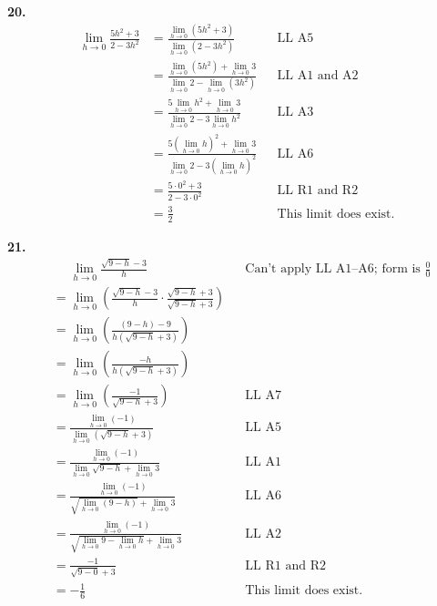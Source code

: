 \documentclass[10pt,oneside,]{book}
\theoremstyle{plain}
\theoremstyle{definition}
\numberwithin{equation}{section}
\begin{document}
\noindent\textbf{20.}\quad{}\begin{align*}
\lim\limits_{h\to0}\frac{5h^2+3}{2-3h^2}&=\frac{\lim\limits_{h\to0}\left(5h^2+3\right)}{\lim\limits_{h\to0}\left(2-3h^2\right)}&&\text{LL A5}\\
&=\frac{\lim\limits_{h\to0}\left(5h^2\right)+\lim\limits_{h\to0}3}{\lim\limits_{h\to0}2-\lim\limits_{h\to0}\left(3h^2\right)}&&\text{LL A1 and A2}\\
&=\frac{5\lim\limits_{h\to0}h^2+\lim\limits_{h\to0}3}{\lim\limits_{h\to0}2-3\lim\limits_{h\to0}h^2}&&\text{LL A3}\\
&=\frac{5\left(\lim\limits_{h\to0}h\right)^2+\lim\limits_{h\to0}3}{\lim\limits_{h\to0}2-3\left(\lim\limits_{h\to0}h\right)^2}&&\text{LL A6}\\
&=\frac{5\cdot0^2+3}{2-3\cdot0^2}&&\text{LL R1 and R2}\\
&=\frac{3}{2}&&\text{This limit does exist.}
\end{align*}%
\par\smallskip
\noindent\textbf{21.}\quad{}\begin{align*}
&\phantom{={}}\lim\limits_{h\to0}\frac{\sqrt{9-h}-3}{h}&&\text{Can't apply LL A1--A6; form is $\tfrac{0}{0}$}\\
&=\lim\limits_{h\to0}\left(\frac{\sqrt{9-h}-3}{h}\cdot\frac{\sqrt{9-h}+3}{\sqrt{9-h}+3}\right)\\
&=\lim\limits_{h\to0}\left(\frac{(9-h)-9}{h\left(\sqrt{9-h}+3\right)}\right)\\
&=\lim\limits_{h\to0}\left(\frac{-h}{h\left(\sqrt{9-h}+3\right)}\right)\\
&=\lim\limits_{h\to0}\left(\frac{-1}{\sqrt{9-h}+3}\right)&&\text{LL A7}\\
&=\frac{\lim\limits_{h\to0}(-1)}{\lim\limits_{h\to0}\left(\sqrt{9-h}+3\right)}&&\text{LL A5}\\
&=\frac{\lim\limits_{h\to0}(-1)}{\lim\limits_{h\to0}\sqrt{9-h}+\lim\limits_{h\to0}3}&&\text{LL A1}\\
&=\frac{\lim\limits_{h\to0}(-1)}{\sqrt{\lim\limits_{h\to0}(9-h)}+\lim\limits_{h\to0}3}&&\text{LL A6}\\
&=\frac{\lim\limits_{h\to0}(-1)}{\sqrt{\lim\limits_{h\to0}9-\lim\limits_{h\to0}h}+\lim\limits_{h\to0}3}&&\text{LL A2}\\
&=\frac{-1}{\sqrt{9-0}+3}&&\text{LL R1 and R2}\\
&=-\frac{1}{6}&&\text{This limit does exist.}
\end{align*}%
\par\smallskip
\end{document}
